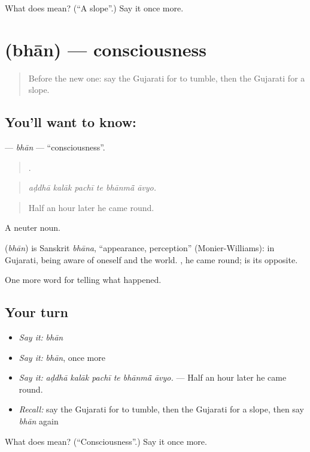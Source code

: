 \begin{tcolorbox}[breakable,colback=teal!4,colframe=teal!35!black,title={Before you move on}]
What does  mean? (\textquotedblleft{}A slope\textquotedblright{}.) Say it once more.
\end{tcolorbox}
\section[\texorpdfstring{\gu{ભાન} (bhān)}{ભાન (bhān)}]{ (bhān) — consciousness}

\label{lesson:GU-C294-bhan}



\begin{quote}
Before the new one: say the Gujarati for to tumble, then the Gujarati for a slope.
\end{quote}

\subsection*{You'll want to know: }
\textbf{} — \emph{bhān} — \textquotedblleft{}consciousness\textquotedblright{}.

\begin{quote}
     .
\end{quote}

\begin{quote}
\emph{aḍdhā kalāk pachī te bhānmā̃ āvyo.}
\end{quote}

\begin{quote}
Half an hour later he came round.
\end{quote}

A neuter noun.

\begin{cousinweb}
\textbf{} (\emph{bhān}) is Sanskrit \emph{bhāna}, \textquotedblleft{}appearance, perception\textquotedblright{} (Monier-Williams): in Gujarati, being aware of oneself and the world. \textbf{ }, he came round; \textbf{} is its opposite.
\end{cousinweb}

\begin{grammarlens}[title={What you've built}]
One more word for telling what happened.
\end{grammarlens}

\subsection*{Your turn}
\begin{itemize}
\raggedright
  \item \emph{Say it:} \emph{bhān}
  \item \emph{Say it:} \emph{bhān}, once more
  \item \emph{Say it:} \emph{aḍdhā kalāk pachī te bhānmā̃ āvyo.} — Half an hour later he came round.
  \item \emph{Recall:} say the Gujarati for to tumble, then the Gujarati for a slope, then say \emph{bhān} again
\end{itemize}

\begin{tcolorbox}[breakable,colback=teal!4,colframe=teal!35!black,title={Before you move on}]
What does  mean? (\textquotedblleft{}Consciousness\textquotedblright{}.) Say it once more.
\end{tcolorbox}
